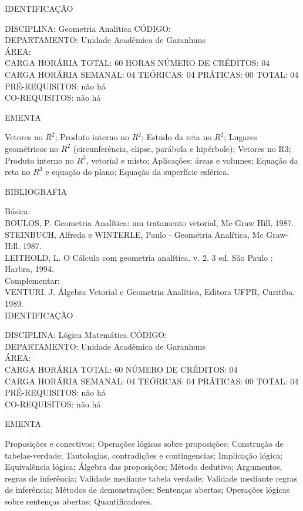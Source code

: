 \documentclass[
	12pt,				%
	openright,			%
  oneside,     %
	a4paper,			%
	english,			%
	french,				%
	spanish,			%
	brazil				%
	]{abntex2}
\begin{document}
\begin{apendicesenv}
\newpage IDENTIFICAÇÃO

DISCIPLINA: Geometria Analítica CÓDIGO:\\
DEPARTAMENTO: Unidade Acadêmica de Garanhuns\\
ÁREA:\\
CARGA HORÁRIA TOTAL: 60 HORAS NÚMERO DE CRÉDITOS: 04\\
CARGA HORÁRIA SEMANAL: 04 TEÓRICAS: 04 PRÁTICAS: 00 TOTAL: 04\\
PRÉ-REQUISITOS: não há\\
CO-REQUISITOS: não há

EMENTA

Vetores no $R^2$; Produto interno no $R^2$; Estudo da reta no $R^2$; Lugares geométricos no $R^2$ (circunferência, elipse, parábola e hipérbole); Vetores no R3; Produto interno no $R^3$, vetorial e misto; Aplicações: áreas e volumes; Equação da reta no $R^3$ e equação do plano; Equação da superfície esférica.

BIBLIOGRAFIA

Básica:\\
BOULOS, P. Geometria Analítica: um tratamento vetorial, Mc-Graw Hill, 1987.\\
STEINBUCH, Alfredo e WINTERLE, Paulo - Geometria Analítica, Mc Graw-Hill, 1987.\\
LEITHOLD, L. O Cálculo com geometria analítica. v. 2. 3 ed. São Paulo :
Harbra, 1994.\\
Complementar:\\
VENTURI, J.   Álgebra Vetorial e Geometria Analítica, Editora UFPR, Curitiba, 1989.\\

\newpage IDENTIFICAÇÃO

DISCIPLINA: Lógica Matemática CÓDIGO:\\
DEPARTAMENTO: Unidade Acadêmica de Garanhuns\\
ÁREA: \\
CARGA HORÁRIA TOTAL: 60 NÚMERO DE CRÉDITOS: 04\\
CARGA HORÁRIA SEMANAL: 04 TEÓRICAS: 04 PRÁTICAS: 00 TOTAL: 04\\
PRÉ-REQUISITOS: não há\\
CO-REQUISITOS: não há

EMENTA

Proposições e conectivos; Operações lógicas sobre proposições;
Construção de tabelas-verdade; Tautologias, contradições e
contingencias; Implicação lógica; Equivalência lógica; Álgebra das
proposições; Método dedutivo; Argumentos, regras de inferência;
Validade mediante tabela verdade; Validade mediante regras de
inferência; Métodos de demonstrações; Sentenças abertas; Operações
lógicas sobre sentenças abertas; Quantificadores.


\end{apendicesenv}
\end{document}
